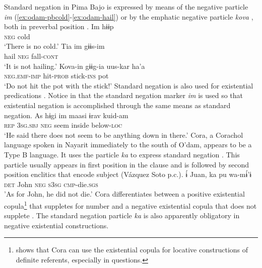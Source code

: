\documentclass[output=paper]{langsci/langscibook}
\begin{document}
Standard negation in Pima Bajo is expressed by means of the negative particle \emph{im} (\ref{ex:odam-pbcold}-\ref{ex:odam-hail}) or by the emphatic negative particle \emph{kova} , both in preverbal position \citep{estrada2014}. 
\ea
\label{ex:odam-pbcold}
\gll Im 	hɨɨp\\
\textsc{neg} 	cold\\
\glt ‘There is no cold.’ \citep[162]{estrada2014}
\z 
\ea
\label{ex:odam-hail}
\gll Tia 		im 	gɨɨs-im\\
hail 	\textsc{neg} 	fall-\textsc{cont}\\
\glt ‘It is not hailing.’ \citep[163]{estrada2014}		
\z 
\ea
\label{ex:odam-kovain}
\gll Kova-in 	gɨɨg-ia 	uus-kar	ha’a\\
\textsc{neg.emf-imp} 	hit-\textsc{prob} 	stick-\textsc{ins} pot\\
\glt ‘Do not hit the pot with the stick!’ \citep[132]{estrada2014}
\z 		
Standard negation is also used for existential predications \citep[155]{estrada2014}. Notice in  that the standard negation marker \emph{im} is used so that existential negation is accomplished through the same means as standard negation.
\ea
\label{ex:odam-pbnoseem}
\gll As hɨgi im maasi ɨrav kuid-am\\
\textsc{rep} \textsc{3sg.sbj} \textsc{neg} seem inside below-\textsc{loc}\\
\glt `He said there does not seem to be anything down in there.' \citep[155]{estrada2014}
\z
Cora, a Corachol language spoken in Nayarit immediately to the south of O’dam, appears to be a Type B language. It uses the particle \emph{ka} to express standard negation . This particle usually appears in first position in the clause and is followed by second position enclitics that encode subject (Vázquez Soto p.c.).
\ea
\label{ex:odam-pbeat}
\gll ɨ́ Juan, ka pu wa-mɨ́'ɨ\\
\textsc{det} John \textsc{neg} \textsc{s3sg} \textsc{cmp}-die.\textsc{sgs}\\
\glt 'As for John, he did not die.' \citep[201]{vasquez2001}
\z 
Cora differentiates between a positive  existential copula\footnote{\citet{vazquez2013} shows that Cora can use the existential copula for locative constructions of definite referents, especially in questions.} that suppletes for number and a negative existential copula that does not supplete . The standard negation particle \emph{ka} is also apparently obligatory in negative existential constructions.
\end{document}
